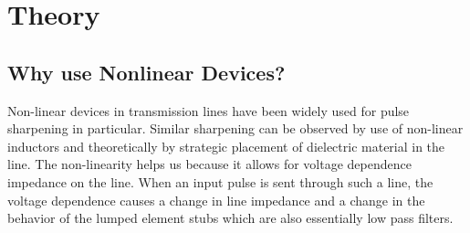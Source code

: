 \documentclass[journal]{IEEEtran} \usepackage[english]{babel}
\begin{document}






%



\section{ Theory }
\subsection{Why use Nonlinear Devices?}

Non-linear devices in transmission lines have been widely used for pulse
sharpening in particular. Similar sharpening can be observed by use of
non-linear inductors and theoretically by strategic placement of dielectric
material in the line\cite{wilson1991pulse}. The non-linearity helps us because
it allows for voltage dependence impedance on the line. When an input pulse is
sent through such a line, the voltage dependence causes a change in line
impedance and a change in the behavior of the lumped element stubs which are
also essentially low pass filters. 
\end{document}
